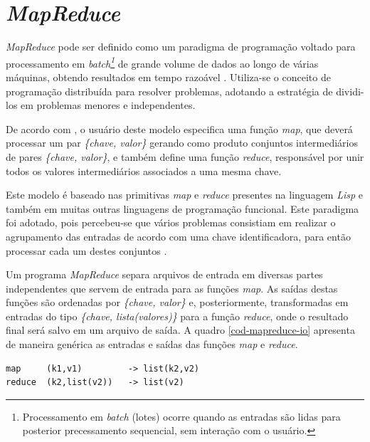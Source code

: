 \section{\textit{MapReduce}}

\textit{MapReduce} pode ser definido como um paradigma de programação voltado para processamento em \textit{batch\footnote{Processamento em \textit{batch} (lotes) ocorre quando as entradas são lidas para posterior precessamento sequencial, sem interação com o usuário.}} de grande volume de dados ao longo de várias máquinas, obtendo resultados em tempo razoável \cite{white2012}. Utiliza-se o conceito de programação distribuída para resolver problemas, adotando a estratégia de dividi-los em problemas menores e independentes.

De acordo com , o usuário deste modelo especifica uma função \textit{map}, que deverá processar um par \textit{\{chave, valor\}} gerando como produto conjuntos  intermediários de pares \textit{\{chave, valor\}}, e também define uma função \textit{reduce}, responsável por unir todos os valores intermediários associados a uma mesma chave.

Este modelo é baseado nas primitivas \textit{map} e \textit{reduce} presentes na linguagem \textit{Lisp} e também em muitas outras linguagens de programação funcional. Este paradigma foi adotado, pois percebeu-se que vários problemas consistiam em realizar o agrupamento das entradas de acordo com uma chave identificadora, para então processar cada um destes conjuntos \cite{ghemawatMapreduce2008}.

Um programa \textit{MapReduce} separa arquivos de entrada em diversas partes independentes que servem de entrada para as funções \textit{map}. As saídas destas funções são ordenadas por \textit{\{chave, valor\}} e, posteriormente, transformadas em entradas do tipo \textit{\{chave, lista(valores)\}} para a função \textit{reduce}, onde o resultado final será salvo em um arquivo de saída. A quadro \ref{cod-mapreduce-io} apresenta de maneira genérica as entradas e saídas das funções \textit{map} e \textit{reduce}.

\begin{lstlisting}[style=abnt,frame=single, 
		caption={[Entradas e saídas - \textit{MapReduce}]Entradas e saídas - \textit{MapReduce}
		\protect\linebreak Fonte: \cite{ghemawatMapreduce2008}},
		label=cod-mapreduce-io]
map     (k1,v1)         -> list(k2,v2)
reduce  (k2,list(v2))   -> list(v2)
\end{lstlisting}
\FloatBarrier

